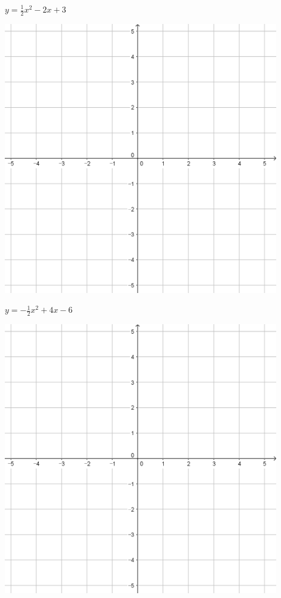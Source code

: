 \documentclass[a4paper]{oblivoir}
\begin{document}
\begin{minipage}{0.45\textwidth}\centering
\(y=\frac12x^2-2x+3\)
\par\bigskip\includegraphics[width=0.9\textwidth]{55}
\end{minipage}
\begin{minipage}{0.45\textwidth}\centering
\(y=-\frac12x^2+4x-6\)
\par\bigskip\includegraphics[width=0.9\textwidth]{55}
\end{minipage}\bigskip\bigskip\par
\end{document}
